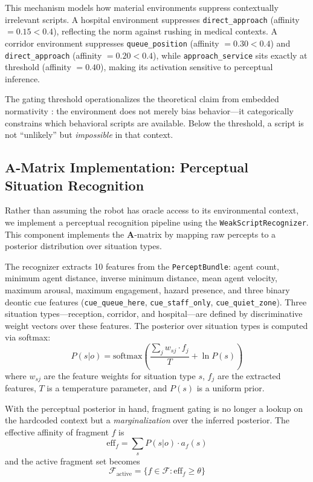 \documentclass[11pt,a4paper]{article}
\newcommand{\A}{\mathbf{A}}
\begin{document}
This mechanism models how material environments suppress contextually irrelevant scripts.  A hospital environment suppresses \texttt{direct\_approach} (affinity $= 0.15 < 0.4$), reflecting the norm against rushing in medical contexts.  A corridor environment suppresses \texttt{queue\_position} (affinity $= 0.30 < 0.4$) and \texttt{direct\_approach} (affinity $= 0.20 < 0.4$), while \texttt{approach\_service} sits exactly at threshold (affinity $= 0.40$), making its activation sensitive to perceptual inference.

The gating threshold operationalizes the theoretical claim from embedded normativity \citep{guenincarlut2023embedded}: the environment does not merely bias behavior---it categorically constrains which behavioral scripts are available.  Below the threshold, a script is not ``unlikely'' but \emph{impossible} in that context.

\subsection{$\A$-Matrix Implementation: Perceptual Situation Recognition}

Rather than assuming the robot has oracle access to its environmental context, we implement a perceptual recognition pipeline using the \texttt{WeakScriptRecognizer}.  This component implements the $\A$-matrix by mapping raw percepts to a posterior distribution over situation types.

The recognizer extracts 10 features from the \texttt{PerceptBundle}: agent count, minimum agent distance, inverse minimum distance, mean agent velocity, maximum arousal, maximum engagement, hazard presence, and three binary deontic cue features (\texttt{cue\_queue\_here}, \texttt{cue\_staff\_only}, \texttt{cue\_quiet\_zone}).  Three situation types---reception, corridor, and hospital---are defined by discriminative weight vectors over these features.  The posterior over situation types is computed via softmax:
\begin{equation}
  P(s | o) = \text{softmax}\!\left(\frac{\sum_j w_{sj} \cdot f_j}{T} + \ln P(s)\right)
  \label{eq:a-matrix}
\end{equation}
where $w_{sj}$ are the feature weights for situation type $s$, $f_j$ are the extracted features, $T$ is a temperature parameter, and $P(s)$ is a uniform prior.

With the perceptual posterior in hand, fragment gating is no longer a lookup on the hardcoded context but a \emph{marginalization} over the inferred posterior.  The effective affinity of fragment $f$ is
\begin{equation}
  \text{eff}_f = \sum_s P(s | o) \cdot a_f(s)
  \label{eq:effective-affinity}
\end{equation}
and the active fragment set becomes
\begin{equation}
  \mathcal{F}_{\text{active}} = \{ f \in \mathcal{F} : \text{eff}_f \geq \theta \}
  \label{eq:d-gating-perceptual}
\end{equation}
\end{document}
